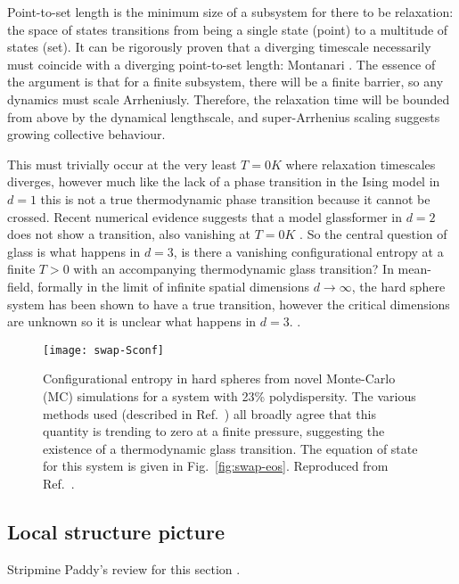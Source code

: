 Point-to-set length is the minimum size of a subsystem for there to be relaxation: the space of states transitions from being a single state (point) to a multitude of states (set).
It can be rigorously proven that a diverging timescale necessarily must coincide with a diverging point-to-set length: Montanari \cite{MontanariJSP2006}.
The essence of the argument is that for a finite subsystem, there will be a finite barrier, so any dynamics must scale Arrheniusly.
Therefore, the relaxation time will be bounded from above by the dynamical lengthscale, and super-Arrhenius scaling suggests growing collective behaviour.

This must trivially occur at the very least $T=0\si{K}$ where relaxation timescales diverges, however much like the lack of a phase transition in the Ising model in $d=1$ this is not a true thermodynamic phase transition because it cannot be crossed.
Recent numerical evidence suggests that a model glassformer in $d=2$ does not show a transition, also vanishing at $T=0\si{K}$ \cite{BerthierNC2019}.
So the central question of glass is what happens in $d=3$, is there a vanishing configurational entropy at a finite $T > 0$ with an accompanying thermodynamic glass transition?
In mean-field, formally in the limit of infinite spatial dimensions $d \to \infty$, the hard sphere system has been shown to have a true transition, however the critical dimensions are unknown so it is unclear what happens in $d=3$. \cite{KurchanJSM2012,KurchanJPCB2013,CharbonneauNC2014,CharbonneauJSM2014}.

\begin{SCfigure}
  \texttt{[image: swap-Sconf]}
  \caption[Configurational entropy in hard spheres from Monte-Carlo simulations]{
    Configurational entropy in hard spheres from novel Monte-Carlo (MC) simulations for a system with 23\% polydispersity.
    The various methods used (described in Ref.\ \cite{BerthierPNAS2017}) all broadly agree that this quantity is trending to zero at a finite pressure, suggesting the existence of a thermodynamic glass transition.
    The equation of state for this system is given in Fig.\ \ref{fig:swap-eos}.
    Reproduced from Ref.\ \cite{BerthierPNAS2017}.
  }
\end{SCfigure}

\subsection{Local structure picture}

Stripmine Paddy's review for this section \cite{RoyallPR2015}.

